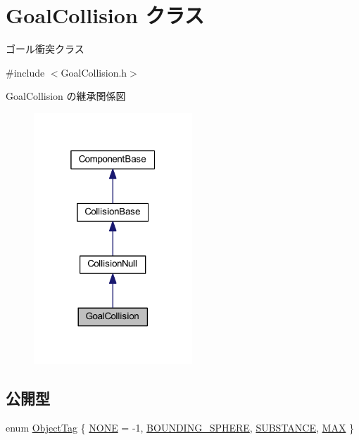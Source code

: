 \hypertarget{class_goal_collision}{}\section{Goal\+Collision クラス}
\label{class_goal_collision}


ゴール衝突クラス  




{\ttfamily \#include $<$Goal\+Collision.\+h$>$}



Goal\+Collision の継承関係図\nopagebreak
\begin{figure}[H]
\begin{center}
\leavevmode
\includegraphics[width=169pt]{class_goal_collision__inherit__graph}
\end{center}
\end{figure}
\subsection*{公開型}
\begin{DoxyCompactItemize}
\item 
enum \mbox{\hyperlink{class_goal_collision_a8d0d760973816d9086df90491f38ff62}{Object\+Tag}} \{ \mbox{\hyperlink{class_goal_collision_a8d0d760973816d9086df90491f38ff62ad664dba1ab9212a7a0c29f3d113f74ba}{N\+O\+NE}} = -\/1, 
\mbox{\hyperlink{class_goal_collision_a8d0d760973816d9086df90491f38ff62ac2036d06505fcf67ddd968f97179789d}{B\+O\+U\+N\+D\+I\+N\+G\+\_\+\+S\+P\+H\+E\+RE}}, 
\mbox{\hyperlink{class_goal_collision_a8d0d760973816d9086df90491f38ff62a99519b2786b3bc408ca13eda97606b81}{S\+U\+B\+S\+T\+A\+N\+CE}}, 
\mbox{\hyperlink{class_goal_collision_a8d0d760973816d9086df90491f38ff62ac8b39f34903a130505e1c485f7667e07}{M\+AX}}
 \}
\end{DoxyCompactItemize}
